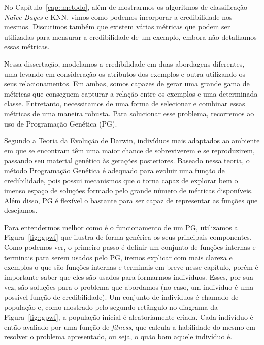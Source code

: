 
No Capítulo~\ref{cap::metodo},
além de mostrarmos os algoritmos de classificação \textit{Naïve Bayes} e \textsc{KNN}, vimos como podemos incorporar a credibilidade nos mesmos.
Discutimos também que existem várias métricas que podem ser utilizadas para mensurar a credibilidade de um exemplo, 
embora não detalhamos essas métricas.

Nessa dissertação, modelamos a credibilidade em duas abordagens diferentes, uma levando em consideração os atributos dos exemplos e outra utilizando os seus relacionamentos. 
Em ambas, somos capazes de gerar uma grande gama de métricas que conseguem capturar a relação entre os exemplos e uma determinada classe.
Entretanto, necessitamos de uma forma de selecionar e combinar essas métricas de uma maneira robusta. Para solucionar esse problema, recorremos ao uso de Programação Genética (\textsc{PG}).

Segundo a Teoria da Evolução de Darwin, indivíduos mais adaptados ao ambiente em que se encontram têm uma maior chance de sobreviverem e se reproduzirem, passando seu material genético às gerações posteriores. Baseado nessa teoria, o método Programação Genética é adequado para evoluir uma função de credibilidade, pois possui mecanismos que o torna capaz de explorar bem o imenso espaço de soluções formado pelo grande número de métricas disponíveis. Além disso, \textsc{PG} é flexível o bastante para ser capaz de representar as funções que desejamos.

Para entendermos melhor como é o funcionamento de um \textsc{PG}, utilizamos a Figura~\ref{fig::gpwf} que ilustra de forma genérica os seus principais componentes.
Como podemos ver, o primeiro passo é definir um conjunto de funções internas e terminais para serem usados pelo \textsc{PG}, iremos explicar com mais clareza e exemplos o que são funções internas e terminais em breve nesse capítulo, porém é importante saber que eles são usados para formarmos indivíduos. 
Esses, por sua vez, são soluções para o problema que abordamos (no caso, um indivíduo é uma possível função de credibilidade).
Um conjunto de indivíduos é chamado de população e, como mostrado pelo segundo retângulo no diagrama da Figura~\ref{fig::gpwf}, a população inicial é aleatoriamente criada. 
Cada indivíduo é então avaliado por uma função de \textit{fitness}, que calcula a habilidade do mesmo em resolver o problema apresentado, ou seja, o quão bom aquele indivíduo é.

